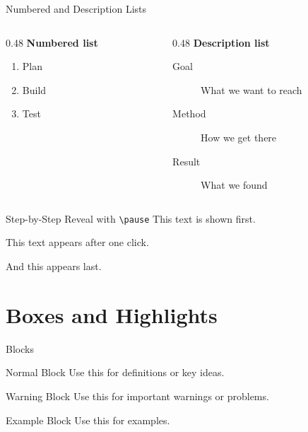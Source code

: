 \documentclass[aspectratio=169, 10pt]{beamer}
\begin{document}
\begin{frame}{Numbered and Description Lists}
  \begin{columns}[T] %
    \begin{column}{0.48\textwidth}
      \textbf{Numbered list}
      \begin{enumerate}
        \item Plan
        \item Build
        \item Test
      \end{enumerate}
    \end{column}
    \begin{column}{0.48\textwidth}
      \textbf{Description list}
      \begin{description}
        \item[Goal] What we want to reach
        \item[Method] How we get there
        \item[Result] What we found
      \end{description}
    \end{column}
  \end{columns}
\end{frame}

\begin{frame}{Step-by-Step Reveal with \texttt{\textbackslash pause}}
  This text is shown first.

  \pause
  This text appears after one click.

  \pause
  \alert{And this appears last.}
\end{frame}

\section{Boxes and Highlights}

\begin{frame}{Blocks}
  \begin{block}{Normal Block}
    Use this for definitions or key ideas.
  \end{block}

  \begin{alertblock}{Warning Block}
    Use this for important warnings or problems.
  \end{alertblock}

  \begin{exampleblock}{Example Block}
    Use this for examples.
  \end{exampleblock}
\end{frame}
\end{document}

